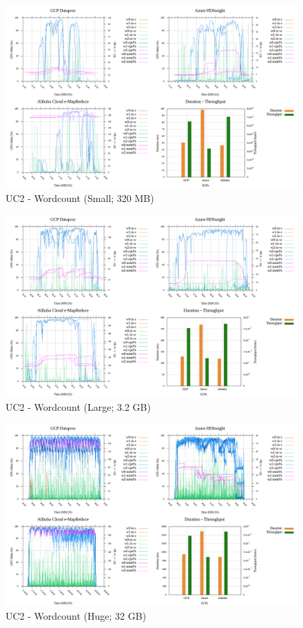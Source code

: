 \documentclass[review]{elsarticle}
\begin{document}
	\begin{figure}[p]
		\caption{UC2 - Wordcount (Small; 320 MB)}
		\label{fig:uc2-wrdcnt-s-cmidt}
		\includegraphics[width=\textwidth]{uc2-wrdcnt-s-cmidt}
		\centering
	\end{figure}
	
	\begin{figure}[p]
		\caption{UC2 - Wordcount (Large; 3.2 GB)}
		\label{fig:uc2-wrdcnt-l-cmidt}
		\includegraphics[width=\textwidth]{uc2-wrdcnt-l-cmidt}
		\centering
	\end{figure}
	
	\begin{figure}[p]
		\caption{UC2 - Wordcount (Huge; 32 GB)}
		\label{fig:uc2-wrdcnt-h-cmidt}
		\includegraphics[width=\textwidth]{uc2-wrdcnt-h-cmidt}
		\centering
	\end{figure}
	
\end{document}
